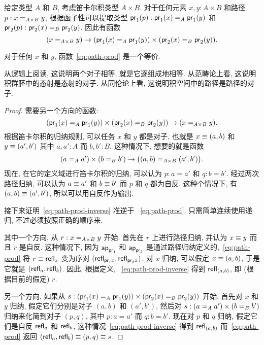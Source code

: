 %
给定类型 $A$ 和 $B$, 考虑笛卡尔积类型 $A \times B$.
对于任何元素 $x,y:A\times B$ 和路径 $p:\id[A\times B]{x}{y}$, 根据函子性可以提取类型 $\ap{\proj1}p:\id[A]{\proj1(x)}{\proj1(y)}$ 和 $\ap{\proj2}p:\id[B]{\proj2(x)}{\proj2(y)}$.
因此有函数
\begin{equation}
    \label{eq:path-prod}
    (\id[A\times B]{x}{y}) \to (\id[A]{\proj1(x)}{\proj1(y)}) \times (\id[B]{\proj2(x)}{\proj2(y)}).
\end{equation}

\begin{thm}
    \label{thm:path-prod}
    对于任何 $x$ 和 $y$, 函数~\eqref{eq:path-prod} 是一个等价.
\end{thm}

从逻辑上阅读, 这说明两个对子相等, 就是它逐组成地相等.
从范畴论上看, 这说明积群胚中的态射是态射的对子.
从同伦论上看, 这说明积空间中的路径是路径的对子.

\begin{proof}
    需要另一个方向的函数:
    \begin{equation}
    (\id[A]{\proj1(x)}{\proj1(y)})
        \times (\id[B]{\proj2(x)}{\proj2(y)}) \to (\id[A\times B]{x}{y}). \label{eq:path-prod-inverse}
    \end{equation}
    根据笛卡尔积的归纳规则, 可以任务 $x$ 和 $y$ 都是对子, 也就是 $x\jdeq (a,b)$ 和 $y\jdeq (a',b')$ 其中 $a,a':A$ 而 $b,b':B$.
    这种情况下, 想要的就是函数
    \begin{equation*}
    (\id[A]{a}{a'})
        \times (\id[B]{b}{b'}) \to \big(\id[A\times B]{(a,b)}{(a',b')}\big).
    \end{equation*}
    现在, 在它的定义域进行笛卡尔积的归纳, 可以认为 $p:a=a'$ 和 $q:b=b'$.
    经过两次路径归纳, 可以认为 $a\jdeq a'$ 和 $b\jdeq b'$ 而 $p$ 和 $q$ 都为自反.
    这种个情况下, 有 $(a,b)\jdeq(a',b')$, 所以可以用自反作为输出.

    接下来证明~\eqref{eq:path-prod-inverse} 准逆于 ~\eqref{eq:path-prod}.
    只需简单连续使用递归, 不过必须按照正确的顺序来.

    其中一个方向, 从 $r:\id[A\times B]{x}{y}$ 开始.
    首先在 $r$ 上进行路径归纳, 并认为 $x\jdeq y$ 而且 $r$ 是自反.
    这种情况下, 因为 $\apfunc{\proj1}$ 和 $\apfunc{\proj2}$ 是通过路径归纳定义的,~\eqref{eq:path-prod} 将 $r\jdeq \refl{x}$ 变为序对 $(\refl{\proj1x},\refl{\proj2x})$.
    对 $x$ 归纳, 可以假定 $x\jdeq (a,b)$, 于是它就是 $(\refl a, \refl b)$.
    因此, 根据定义, ~\eqref{eq:path-prod-inverse} 得到 $\refl{(a,b)}$, 即 (根据目前的假定) $r$.

    另一个方向, 如果从 $s:(\id[A]{\proj1(x)}{\proj1(y)}) \times (\id[B]{\proj2(x)}{\proj2(y)})$ 开始, 首先对 $x$ 和 $y$ 归纳, 假定它们分别是对子 $(a,b)$ 和 $(a',b')$, 然后对 $s:(\id[A]{a}{a'}) \times (\id[B]{b}{b'})$ 归纳来化简到对子 $(p,q)$, 其中 $p:a=a'$ 而 $q:b=b'$.
    现在对 $p$ 和 $q$ 归纳, 假定它们是自反 $\refl a$ 和 $\refl b$, 这种情况~\eqref{eq:path-prod-inverse} 得到 $\refl{(a,b)}$ 而~\eqref{eq:path-prod} 返回 $(\refl a,\refl b)\jdeq (p,q)\jdeq s$.
\end{proof}

